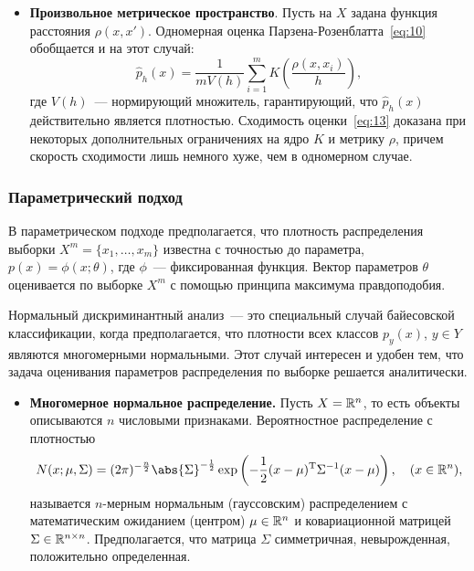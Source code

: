 \begin{itemize}
  \item[] \textbf{Произвольное метрическое пространство}. Пусть на \( X \) задана функция расстояния
    \( \rho(x, x') \). Одномерная оценка Парзена-Розенблатта~\eqref{eq:10} обобщается и на этот случай:
    \begin{equation}
      \hat{p}_h(x) = \frac{1}{mV(h)}\sum_{i = 1}^m K\left(\frac{\rho(x, x_i)}{h}\right),
      \label{eq:13}
    \end{equation}
    где \( V(h) \)~--- нормирующий множитель, гарантирующий, что \( \hat{p}_h(x) \) действительно
    является плотностью. Сходимость оценки~\eqref{eq:13} доказана при некоторых дополнительных
    ограничениях на ядро \( K \) и метрику \( \rho \), причем скорость сходимости лишь немного хуже,
    чем в одномерном случае.
\end{itemize}

\subsubsection{Параметрический подход}
В параметрическом подходе предполагается, что плотность распределения выборки
\( X^m = \{x_1, \ldots, x_m\} \) известна с точностью до параметра, \( p(x) = \phi(x; \theta) \), где
\( \phi \)~--- фиксированная функция. Вектор параметров \( \theta \) оценивается по выборке \( X^m \) с
помощью принципа максимума правдоподобия.

Нормальный дискриминантный анализ~--- это специальный случай байесовской классификации, когда
предполагается, что плотности всех классов \( p_y(x) \), \( y\in Y \) являются многомерными
нормальными. Этот случай интересен и удобен тем, что задача оценивания параметров распределения по
выборке решается аналитически.

\begin{itemize}
  \itemsep -5pt
  \item[] \textbf{Многомерное нормальное распределение.}
    Пусть \( X = \mathbb{R}^n \), то есть объекты описываются \( n \) числовыми признаками. Вероятностное
    распределение с плотностью
    \[
      N(x;\mu,\Sigma) = (2\pi)^{-\frac{n}{2}}\abs{\Sigma}^{-\frac{1}{2}}
      \exp\left(-\frac{1}{2}(x - \mu)^\T\Sigma^{-1}(x - \mu)\right), \quad (x\in \RE^n),
    \]
называется \( n \)-мерным нормальным (гауссовским) распределением с математическим ожиданием (центром)
\( \mu\in\mathbb{R}^n \) и ковариационной матрицей \( \Sigma\in\mathbb{R}^{n\times n} \). Предполагается, что матрица
\( \Sigma \) симметричная, невырожденная, положительно определенная.
\end{itemize}    

